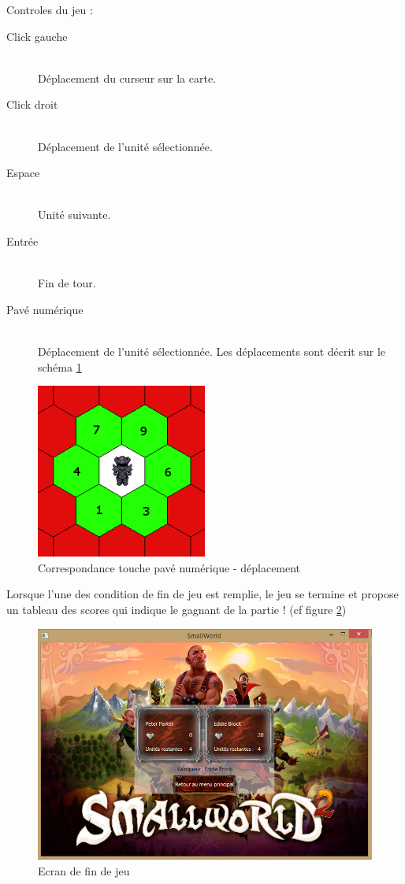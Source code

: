 		Controles du jeu : 
		\begin{description}
			\item[Click gauche] \hfill \\
				Déplacement du curseur sur la carte.
			\item[Click droit] \hfill \\
				Déplacement de l'unité sélectionnée.
			\item[Espace] \hfill \\
				Unité suivante.
			\item[Entrée] \hfill \\
				Fin de tour.
			\item[Pavé numérique] \hfill \\
				Déplacement de l'unité sélectionnée. Les déplacements sont décrit sur le schéma \ref{fig:poskeys}
		\end{description}
		
		\begin{figure}[h!]
			\caption{Correspondance touche pavé numérique - déplacement}
			\label{fig:poskeys}
			\centering
			\includegraphics[width=0.5\textwidth]{res/pavnum_moves}
		\end{figure}
		
		Lorsque l'une des condition de fin de jeu est remplie, le jeu se termine et propose un tableau des scores qui indique le gagnant de la partie ! (cf figure \ref{fig:finjeu})
		\begin{figure}[h!]
			\caption{Ecran de fin de jeu}
			\label{fig:finjeu}
			\centering
			\includegraphics[width=\textwidth]{res/end_game}
		\end{figure}
